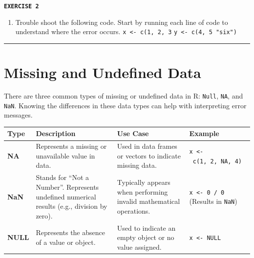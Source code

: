 \documentclass[
]{book}
\providecommand{\tightlist}{%
  \setlength{\itemsep}{0pt}\setlength{\parskip}{0pt}}
\begin{document}
\textbf{\texttt{EXERCISE\ 2}}

\begin{enumerate}
\def\labelenumi{\arabic{enumi}.}
\tightlist
\item
  Trouble shoot the following code. Start by running each line of code to understand where the error occurs.
  \texttt{x\ \textless{}-\ c(1,\ 2,\ 3}
  \texttt{y\ \textless{}-\ c(4,\ 5\ "six")}
\end{enumerate}

\begin{center}\rule{0.5\linewidth}{0.5pt}\end{center}

\section{Missing and Undefined Data}\label{missing-and-undefined-data}

There are three common types of missing or undefined data in R: \texttt{Null}, \texttt{NA}, and \texttt{NaN}. Knowing the differences in these data types can help with interpreting error messages.

\begin{longtable}[]{@{}
  >{\raggedright\arraybackslash}p{}
  >{\raggedright\arraybackslash}p{}
  >{\raggedright\arraybackslash}p{}
  >{\raggedright\arraybackslash}p{}@{}}
\toprule\noalign{}
\begin{minipage}[b]{\linewidth}\raggedright
\textbf{Type}
\end{minipage} & \begin{minipage}[b]{\linewidth}\raggedright
\textbf{Description}
\end{minipage} & \begin{minipage}[b]{\linewidth}\raggedright
\textbf{Use Case}
\end{minipage} & \begin{minipage}[b]{\linewidth}\raggedright
\textbf{Example}
\end{minipage} \\
\midrule\noalign{}
\endhead
\bottomrule\noalign{}
\endlastfoot
\textbf{NA} & Represents a missing or unavailable value in data. & Used in data frames or vectors to indicate missing data. & \texttt{x\ \textless{}-\ c(1,\ 2,\ NA,\ 4)} \\
\textbf{NaN} & Stands for ``Not a Number''. Represents undefined numerical results (e.g., division by zero). & Typically appears when performing invalid mathematical operations. & \texttt{x\ \textless{}-\ 0\ /\ 0} (Results in \texttt{NaN}) \\
\textbf{NULL} & Represents the absence of a value or object. & Used to indicate an empty object or no value assigned. & \texttt{x\ \textless{}-\ NULL} \\
\end{longtable}
\end{document}
